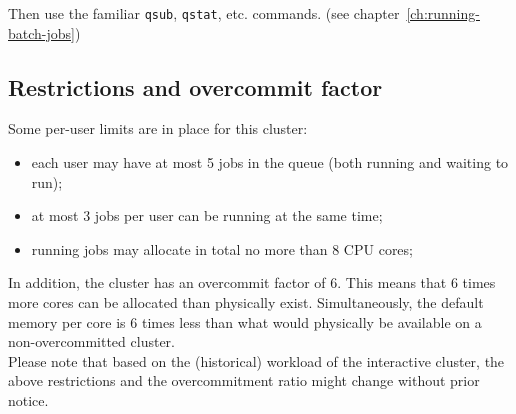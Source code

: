 \begin{prompt}
\end{prompt}

Then use the familiar \lstinline|qsub|, \lstinline|qstat|, etc. commands. (see chapter~\ref{ch:running-batch-jobs})

\subsection{Restrictions and overcommit factor}
\label{subsec:interactive_ugent_restrictions}

Some per-user limits are in place for this cluster:
\begin{itemize}
  \item each user may have at most 5 jobs in the queue (both running and waiting to run);
  \item at most 3 jobs per user can be running at the same time;
  \item running jobs may allocate in total no more than 8 CPU cores;
\end{itemize}

In addition, the cluster has an overcommit factor of 6. This means that 6 times more cores
can be allocated than physically exist. Simultaneously, the default memory per core is 6
times less than what would physically be available on a non-overcommitted cluster.
 \\
Please note that based on the (historical) workload of the interactive cluster, the above
restrictions and the overcommitment ratio might change without prior notice.
